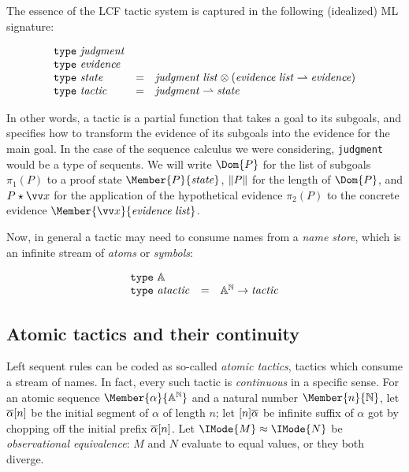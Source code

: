 The essence of the LCF tactic system is captured in the following (idealized)
ML signature:

\[
  \begin{array}{lcl}
    \mathtt{type}\ \mathit{judgment}\\
    \mathtt{type}\ \mathit{evidence}\\
    \mathtt{type}\ \mathit{state} &= &\mathit{judgment}\;\mathit{list} \otimes (\mathit{evidence}\;\mathit{list}\rightharpoonup \mathit{evidence})\\
    \mathtt{type}\ \mathit{tactic} &= &\mathit{judgment}\rightharpoonup \mathit{state}
  \end{array}
\]

In other words, a tactic is a partial function that takes a goal to its
subgoals, and specifies how to transform the evidence of its subgoals into the
evidence for the main goal. In the case of the sequence calculus we were
considering, \verb!judgment! would be a type of sequents. We will write
$\Dom{P}$ for the list of subgoals $\pi_1(P)$ to a proof state
$\Member{P}{\LCFState}$, $\lVert P\rVert$ for the length of $\Dom{P}$, and
$\LCFStateApply{P}{\vec{x}}$ for the application of the hypothetical evidence
$\pi_2(P)$ to the concrete evidence $\Member{\vec{x}}{\MLList{\LCFEvidence}}$.

Now, in general a tactic may need to consume names from a \emph{name store},
which is an infinite stream of \emph{atoms} or \emph{symbols}:

\[
  \begin{array}{lcl}
    \mathtt{type}\ \mathbb{A}\\
    \mathtt{type}\ \mathit{atactic} &= &{\mathbb{A}}^{\mathbb{N}} \to \mathit{tactic}
  \end{array}
\]

\newcommand\KleeneEq[2]{\IMode{#1}\approx \IMode{#2}}
\newcommand\ModC[2]{\mathsf{M}(#1,#2)}

\subsection{Atomic tactics and their continuity}

Left sequent rules can be coded as so-called \emph{atomic tactics}, tactics
which consume a stream of names. In fact, every such tactic is
\emph{continuous} in a specific sense. For an atomic sequence
$\Member{\alpha}{\MLStream{\MLAtom}}$ and a natural number
$\Member{n}{\MLNat}$, let $\protect\overline{\alpha}[n]$ be the initial segment of
$\alpha$ of length $n$; let $[n]\protect\overline{\alpha}$ be infinite suffix of
$\alpha$ got by chopping off the initial prefix $\protect\overline{\alpha}[n]$. Let
$\KleeneEq{M}{N}$ be \emph{observational equivalence}: $M$ and $N$ evaluate to
equal values, or they both diverge.

